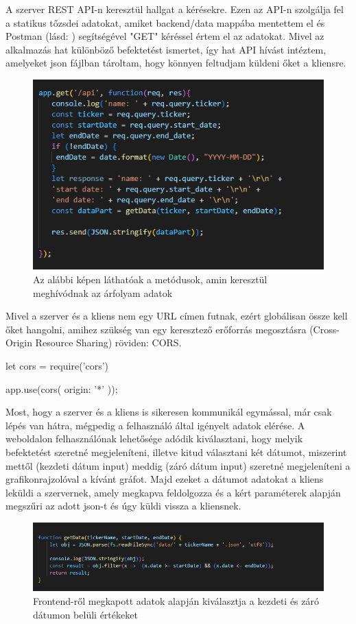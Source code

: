 A szerver REST API-n keresztül hallgat a kérésekre. Ezen az API-n szolgálja fel a statikus tőzsdei adatokat, amiket backend/data mappába mentettem el és Postman  (lásd: ) segítségével "GET" kéréssel értem el az adatokat. Mivel az alkalmazás hat különböző befektetést ismertet, így hat API hívást intéztem, amelyeket json fájlban tároltam, hogy könnyen feltudjam küldeni őket a kliensre.

\begin{figure}[h]
\centering
\includegraphics[scale=0.8]{images/apiCall.png}
\caption{Az alábbi képen láthatóak a metódusok, amin keresztül meghívódnak az árfolyam adatok}
\end{figure}

Mivel a szerver és a kliens nem egy URL címen futnak, ezért globálisan össze kell őket hangolni, amihez szükség van egy keresztező erőforrás megosztásra (Cross-Origin Resource Sharing) röviden: CORS. 
 
\pagebreak

\begin{cpp}
let cors = require('cors')

app.use(cors({
   origin: '*'
}));
\end{cpp} 

Most, hogy a szerver és a kliens is sikeresen kommunikál egymással, már csak lépés van hátra, mégpedig a felhasználó által igényelt adatok elérése. A weboldalon felhasználónak lehetősége adódik kiválasztani, hogy melyik befektetést szeretné megjeleníteni, illetve kitud választani két dátumot, miszerint mettől (kezdeti dátum input) meddig (záró dátum input) szeretné megjeleníteni a grafikonrajzolóval a kívánt gráfot. Majd ezeket a dátumot adatokat a kliens leküldi a szervernek, amely megkapva feldolgozza és a kért paraméterek alapján megszűri az adott json-t és úgy küldi vissza a kliensnek.

\begin{figure}[h]
\centering
\includegraphics[scale=0.7]{images/getData.png}
\caption{Frontend-ről megkapott adatok alapján kiválasztja a kezdeti és záró dátumon belüli értékeket}
\end{figure}